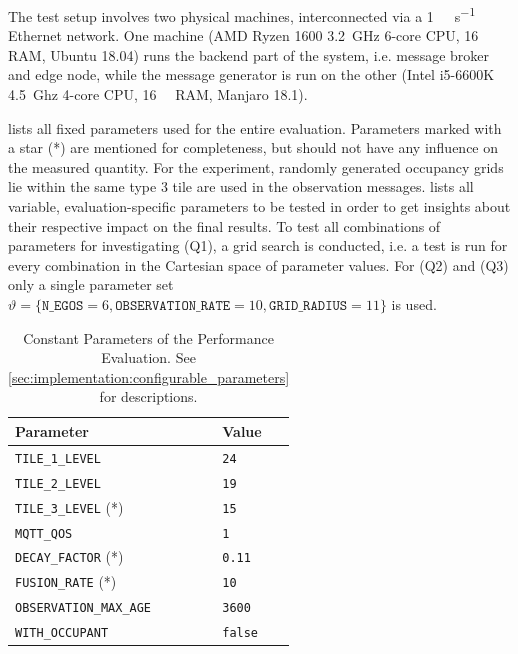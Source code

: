 The test setup involves two physical machines, interconnected via a \SI{1}{\giga\bit\per\second} Ethernet network. One machine (AMD Ryzen 1600 \SI{3.2}{\giga\hertz} 6-core CPU, \SI{16}{\giga\byte} RAM, Ubuntu 18.04) runs the backend part of the system, i.e. message broker and edge node, while the message generator is run on the other (Intel i5-6600K \SI{4.5}{Ghz} 4-core CPU, \SI{16}{\giga\byte} RAM, Manjaro 18.1).
\par
\bigskip

 lists all fixed parameters used for the entire evaluation. Parameters marked with a star (*) are mentioned for completeness, but should not have any influence on the measured quantity. For the experiment, randomly generated occupancy grids lie within the same type 3 tile are used in the observation messages.  lists all variable, evaluation-specific parameters to be tested in order to get insights about their respective impact on the final results. To test all combinations of parameters for investigating (Q1), a grid search is conducted, i.e. a test is run for every combination in the Cartesian space of parameter values. For (Q2) and (Q3) only a single parameter set $\vartheta = \{ \texttt{N\_EGOS} = 6, \texttt{OBSERVATION\_RATE} = 10, \texttt{GRID\_RADIUS} = 11 \}$ is used.

\begin{table}
	\centering
	\begin{tabular}{|p{4.5cm}|p{2cm}|}
		\hline 
		\textbf{Parameter} & \textbf{Value} \\ \hline 
		\texttt{TILE\_1\_LEVEL} & \texttt{24} \\ \hline 
		\texttt{TILE\_2\_LEVEL} & \texttt{19} \\ \hline 
		\texttt{TILE\_3\_LEVEL} (*) & \texttt{15} \\ \hline 
		\texttt{MQTT\_QOS} & \texttt{1} \\ \hline 
		\texttt{DECAY\_FACTOR} (*) & \texttt{0.11} \\ \hline 
		\texttt{FUSION\_RATE} (*) & \texttt{10} \\ \hline 
		\texttt{OBSERVATION\_MAX\_AGE} & \texttt{3600} \\ \hline 
		\texttt{WITH\_OCCUPANT} & \texttt{false} \\ \hline 
	\end{tabular}
	\caption[Constant Parameters of the Performance Evaluation]{Constant Parameters of the Performance Evaluation. See \cref{sec:implementation:configurable_parameters} for descriptions.}
	\label{tab:performance_evaluation:constant_parameters}
\end{table}

